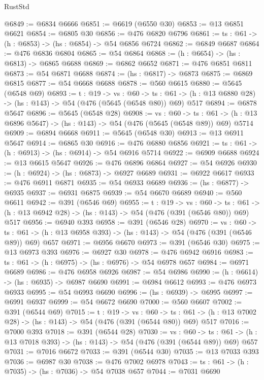 \begin{lexlean}{RustStd}
\begin{coremodule}
@6849 := @6834 @6666
@6851 := @6619 (@6550 @30)
@6853 := @13 @6851 @6621
@6854 := @6805 @30
@6856 := @476 @6820 @6796
@6861 := {ts : @61} -> (h : @6853) -> (hs : @6854) -> @54 @6856 @6724
@6862 := @6849 @6687
@6864 := @476 @6836 @6804
@6865 := @54 @6864
@6868 := (h : @6654) -> (hs : @6813) -> @6865 @6688
@6869 := @6862 @6652
@6871 := @476 @6851 @6811
@6873 := @54 @6871 @6688
@6874 := (hs : @6817) -> @6873
@6875 := @6869 @6815
@6877 := @54 @6668 @6688
@6878 := @560 @6615
@6880 := @5645 (@6548 @69)
@6893 := {t : @19} ->
  {vs : @60} ->
  {ts : @61} -> (h : @13 @6880 @28) -> (hs : @143) -> @54 (@476 (@5645 (@6548 @80)) @69) @517
@6894 := @6878 @5647
@6896 := @5645 (@6548 @28)
@6908 := {vs : @60} ->
  {ts : @61} -> (h : @13 @6896 @5647) -> (hs : @143) -> @54 (@476 (@5645 (@6548 @89)) @69) @5714
@6909 := @6894 @6668
@6911 := @5645 (@6548 @30)
@6913 := @13 @6911 @5647
@6914 := @6865 @30
@6916 := @476 @6880 @6856
@6921 := {ts : @61} -> (h : @6913) -> (hs : @6914) -> @54 @6916 @5714
@6922 := @6909 @6688
@6924 := @13 @6615 @5647
@6926 := @476 @6896 @6864
@6927 := @54 @6926
@6930 := (h : @6924) -> (hs : @6873) -> @6927 @6689
@6931 := @6922 @6617
@6933 := @476 @6911 @6871
@6935 := @54 @6933 @6689
@6936 := (hs : @6877) -> @6935
@6937 := @6931 @6875
@6939 := @54 @6670 @6689
@6940 := @560 @6611
@6942 := @391 (@6546 @69)
@6955 := {t : @19} ->
  {vs : @60} ->
  {ts : @61} -> (h : @13 @6942 @28) -> (hs : @143) -> @54 (@476 (@391 (@6546 @80)) @69) @517
@6956 := @6940 @393
@6958 := @391 (@6546 @28)
@6970 := {vs : @60} ->
  {ts : @61} -> (h : @13 @6958 @393) -> (hs : @143) -> @54 (@476 (@391 (@6546 @89)) @69) @657
@6971 := @6956 @6670
@6973 := @391 (@6546 @30)
@6975 := @13 @6973 @393
@6976 := @6927 @30
@6978 := @476 @6942 @6916
@6983 := {ts : @61} -> (h : @6975) -> (hs : @6976) -> @54 @6978 @657
@6984 := @6971 @6689
@6986 := @476 @6958 @6926
@6987 := @54 @6986
@6990 := (h : @6614) -> (hs : @6935) -> @6987 @6690
@6991 := @6984 @6612
@6993 := @476 @6973 @6933
@6995 := @54 @6993 @6690
@6996 := (hs : @6939) -> @6995
@6997 := @6991 @6937
@6999 := @54 @6672 @6690
@7000 := @560 @6607
@7002 := @391 (@6544 @69)
@7015 := {t : @19} ->
  {vs : @60} ->
  {ts : @61} -> (h : @13 @7002 @28) -> (hs : @143) -> @54 (@476 (@391 (@6544 @80)) @69) @517
@7016 := @7000 @393
@7018 := @391 (@6544 @28)
@7030 := {vs : @60} ->
  {ts : @61} -> (h : @13 @7018 @393) -> (hs : @143) -> @54 (@476 (@391 (@6544 @89)) @69) @657
@7031 := @7016 @6672
@7033 := @391 (@6544 @30)
@7035 := @13 @7033 @393
@7036 := @6987 @30
@7038 := @476 @7002 @6978
@7043 := {ts : @61} -> (h : @7035) -> (hs : @7036) -> @54 @7038 @657
@7044 := @7031 @6690

\end{coremodule}
\end{lexlean}
